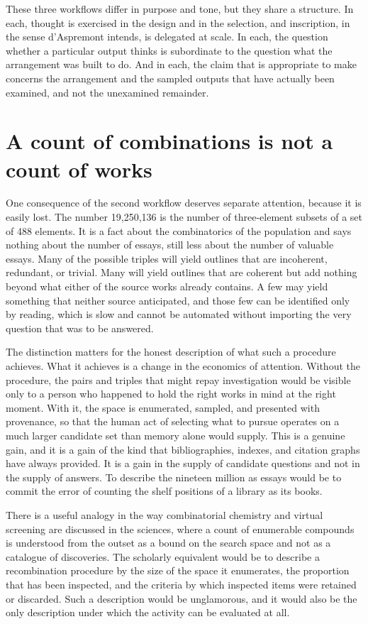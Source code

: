 \documentclass[12pt]{article}
\begin{document}
These three workflows differ in purpose and tone, but they share a structure. In each, thought is exercised in the design and in the selection, and inscription, in the sense d'Aspremont intends, is delegated at scale. In each, the question whether a particular output thinks is subordinate to the question what the arrangement was built to do. And in each, the claim that is appropriate to make concerns the arrangement and the sampled outputs that have actually been examined, and not the unexamined remainder.

\section{A count of combinations is not a count of works}

One consequence of the second workflow deserves separate attention, because it is easily lost. The number 19,250,136 is the number of three-element subsets of a set of 488 elements. It is a fact about the combinatorics of the population and says nothing about the number of essays, still less about the number of valuable essays. Many of the possible triples will yield outlines that are incoherent, redundant, or trivial. Many will yield outlines that are coherent but add nothing beyond what either of the source works already contains. A few may yield something that neither source anticipated, and those few can be identified only by reading, which is slow and cannot be automated without importing the very question that was to be answered.

The distinction matters for the honest description of what such a procedure achieves. What it achieves is a change in the economics of attention. Without the procedure, the pairs and triples that might repay investigation would be visible only to a person who happened to hold the right works in mind at the right moment. With it, the space is enumerated, sampled, and presented with provenance, so that the human act of selecting what to pursue operates on a much larger candidate set than memory alone would supply. This is a genuine gain, and it is a gain of the kind that bibliographies, indexes, and citation graphs have always provided. It is a gain in the supply of candidate questions and not in the supply of answers. To describe the nineteen million as essays would be to commit the error of counting the shelf positions of a library as its books.

There is a useful analogy in the way combinatorial chemistry and virtual screening are discussed in the sciences, where a count of enumerable compounds is understood from the outset as a bound on the search space and not as a catalogue of discoveries. The scholarly equivalent would be to describe a recombination procedure by the size of the space it enumerates, the proportion that has been inspected, and the criteria by which inspected items were retained or discarded. Such a description would be unglamorous, and it would also be the only description under which the activity can be evaluated at all.
\end{document}
